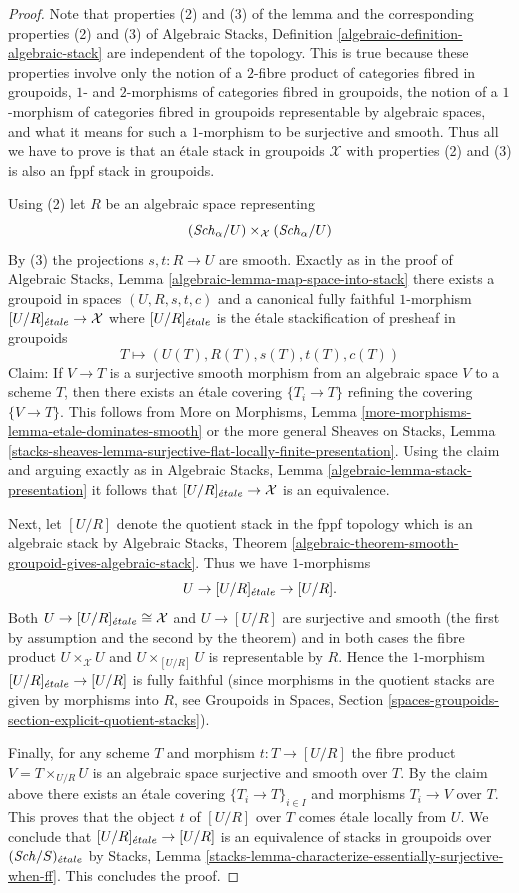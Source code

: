 \begin{proof}
Note that properties (2) and (3) of the lemma and the corresponding
properties (2) and (3) of
Algebraic Stacks, Definition \ref{algebraic-definition-algebraic-stack}
are independent of the topology. This is true because these properties
involve only the notion of a $2$-fibre product of categories fibred in
groupoids, $1$- and $2$-morphisms of categories fibred in groupoids, the
notion of a $1$-morphism of categories fibred in groupoids representable
by algebraic spaces, and what it means for such a $1$-morphism to be
surjective and smooth.
Thus all we have to prove is that an \'etale stack in groupoids
$\mathcal{X}$ with properties (2) and (3) is also an fppf stack in groupoids.

\medskip\noindent
Using (2) let $R$ be an algebraic space representing
$$
(\mathit{Sch}_\alpha/U) \times_\mathcal{X} (\mathit{Sch}_\alpha/U)
$$
By (3) the projections $s, t : R \to U$ are smooth. Exactly as in the proof of
Algebraic Stacks, Lemma \ref{algebraic-lemma-map-space-into-stack}
there exists a groupoid in spaces $(U, R, s, t, c)$ and a canonical
fully faithful $1$-morphism $[U/R]_{\acute{e}tale} \to \mathcal{X}$
where $[U/R]_{\acute{e}tale}$ is the \'etale stackification of presheaf
in groupoids
$$
T \longmapsto (U(T), R(T), s(T), t(T), c(T))
$$
Claim: If $V \to T$ is a surjective smooth morphism from an algebraic space
$V$ to a scheme $T$, then there exists an \'etale covering $\{T_i \to T\}$
refining the covering $\{V \to T\}$. This follows from
More on Morphisms, Lemma \ref{more-morphisms-lemma-etale-dominates-smooth}
or the more general
Sheaves on Stacks, Lemma
\ref{stacks-sheaves-lemma-surjective-flat-locally-finite-presentation}.
Using the claim and arguing exactly as in
Algebraic Stacks, Lemma \ref{algebraic-lemma-stack-presentation}
it follows that $[U/R]_{\acute{e}tale} \to \mathcal{X}$ is an
equivalence.

\medskip\noindent
Next, let $[U/R]$ denote the quotient stack in the fppf topology
which is an algebraic stack by
Algebraic Stacks, Theorem
\ref{algebraic-theorem-smooth-groupoid-gives-algebraic-stack}.
Thus we have $1$-morphisms
$$
U \to [U/R]_{\acute{e}tale} \to [U/R].
$$
Both $U \to [U/R]_{\acute{e}tale} \cong \mathcal{X}$ and
$U \to [U/R]$ are surjective and smooth (the first by assumption
and the second by the theorem) and in both cases the
fibre product $U \times_\mathcal{X} U$ and $U \times_{[U/R]} U$
is representable by $R$. Hence the $1$-morphism
$[U/R]_{\acute{e}tale} \to [U/R]$ is fully faithful (since morphisms
in the quotient stacks are given by morphisms into $R$, see
Groupoids in Spaces, Section
\ref{spaces-groupoids-section-explicit-quotient-stacks}).

\medskip\noindent
Finally, for any scheme $T$ and morphism $t : T \to [U/R]$ the fibre product
$V = T \times_{U/R} U$ is an algebraic space surjective and smooth over $T$.
By the claim above there exists an \'etale covering $\{T_i \to T\}_{i \in I}$
and morphisms $T_i \to V$ over $T$. This proves that the object
$t$ of $[U/R]$ over $T$ comes \'etale locally from $U$. We conclude that
$[U/R]_{\acute{e}tale} \to [U/R]$ is an equivalence of stacks in
groupoids over $(\mathit{Sch}/S)_{\acute{e}tale}$ by
Stacks, Lemma \ref{stacks-lemma-characterize-essentially-surjective-when-ff}.
This concludes the proof.
\end{proof}
